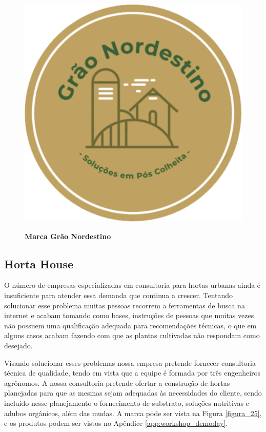 \begin{figure}[H]
\centering
\caption{\textbf{Marca Grão Nordestino}}
\includegraphics[scale=0.5]{Imagens/graonordestino.png}
\label{figura_21}
\end{figure}

\subsection{Horta House}


O número de empresas especializadas em consultoria para hortas urbanas ainda é insuficiente para atender essa demanda que continua a crescer. Tentando solucionar esse problema muitas pessoas recorrem a ferramentas de busca na internet e acabam tomando como bases, instruções de pessoas que muitas vezes não possuem uma qualificação adequada para recomendações técnicas, o que em alguns casos acabam fazendo com que as plantas cultivadas não respondam como desejado.


Visando solucionar esses problemas nossa empresa pretende fornecer consultoria técnica de qualidade, tendo em vista que a equipe é formada por três engenheiros agrônomos. A nossa consultoria pretende ofertar a construção de hortas planejadas para que as mesmas sejam adequadas às necessidades do cliente, sendo incluído nesse planejamento o fornecimento de substrato, soluções nutritivas e adubos orgânicos, além das mudas. A marca pode ser vista na Figura \ref{figura_25}, e os produtos podem ser vistos no Apêndice \ref{app:workshop_demoday}.


